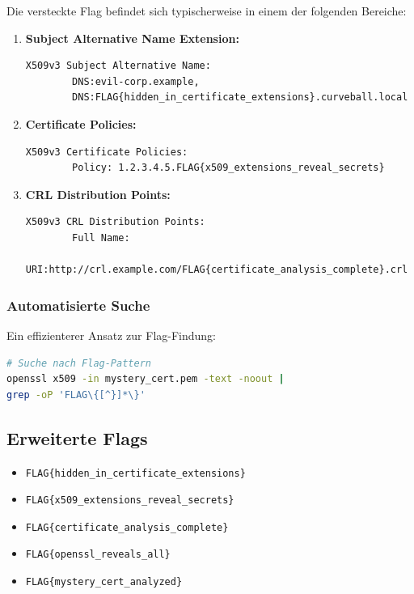 \documentclass{article}
\begin{document}
Die versteckte Flag befindet sich typischerweise in einem der folgenden Bereiche:

\begin{enumerate}[leftmargin=1.5cm]
    \item \textbf{Subject Alternative Name Extension:} 
    \begin{lstlisting}[caption=SAN Extension mit Flag]
    X509v3 Subject Alternative Name:
        DNS:evil-corp.example, 
        DNS:FLAG{hidden_in_certificate_extensions}.curveball.local
    \end{lstlisting}
    
    \item \textbf{Certificate Policies:}
    \begin{lstlisting}[caption=Certificate Policies mit Flag]
    X509v3 Certificate Policies:
        Policy: 1.2.3.4.5.FLAG{x509_extensions_reveal_secrets}
    \end{lstlisting}
    
    \item \textbf{CRL Distribution Points:}
    \begin{lstlisting}[caption=CRL Distribution Points mit Flag]
    X509v3 CRL Distribution Points:
        Full Name:
          URI:http://crl.example.com/FLAG{certificate_analysis_complete}.crl
    \end{lstlisting}
\end{enumerate}

\subsubsection{Automatisierte Suche}
Ein effizienterer Ansatz zur Flag-Findung:

\begin{lstlisting}[language=bash,caption={Automatisierte Flag-Suche}]
# Suche nach Flag-Pattern
openssl x509 -in mystery_cert.pem -text -noout | 
grep -oP 'FLAG\{[^}]*\}'
\end{lstlisting}

\subsection{Erweiterte Flags}

\begin{tcolorbox}[colback=solution-bg,colframe=green!70!black,title=\textbf{Mögliche Challenge-Flags}]
\begin{itemize}[leftmargin=1.5cm]
    \item \texttt{FLAG\{hidden\_in\_certificate\_extensions\}}
    \item \texttt{FLAG\{x509\_extensions\_reveal\_secrets\}}
    \item \texttt{FLAG\{certificate\_analysis\_complete\}}
    \item \texttt{FLAG\{openssl\_reveals\_all\}}
    \item \texttt{FLAG\{mystery\_cert\_analyzed\}}
\end{itemize}
\end{tcolorbox}
\end{document}
